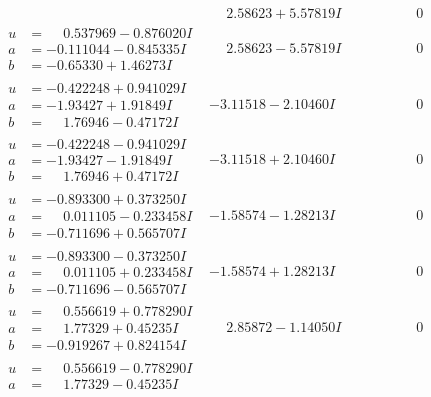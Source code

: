 \documentclass[1p]{elsarticle_modified}
\theoremstyle{definition}
\begin{document}
$$\begin{array}{c|c|c}
 & \phantom{-}2.58623 + 5.57819 I & \phantom{-0.000000 } 0 \\ \hline\begin{aligned}
u &= \phantom{-}0.537969 - 0.876020 I \\
a &= -0.111044 - 0.845335 I \\
b &= -0.65330 + 1.46273 I\end{aligned}
 & \phantom{-}2.58623 - 5.57819 I & \phantom{-0.000000 } 0 \\ \hline\begin{aligned}
u &= -0.422248 + 0.941029 I \\
a &= -1.93427 + 1.91849 I \\
b &= \phantom{-}1.76946 - 0.47172 I\end{aligned}
 & -3.11518 - 2.10460 I & \phantom{-0.000000 } 0 \\ \hline\begin{aligned}
u &= -0.422248 - 0.941029 I \\
a &= -1.93427 - 1.91849 I \\
b &= \phantom{-}1.76946 + 0.47172 I\end{aligned}
 & -3.11518 + 2.10460 I & \phantom{-0.000000 } 0 \\ \hline\begin{aligned}
u &= -0.893300 + 0.373250 I \\
a &= \phantom{-}0.011105 - 0.233458 I \\
b &= -0.711696 + 0.565707 I\end{aligned}
 & -1.58574 - 1.28213 I & \phantom{-0.000000 } 0 \\ \hline\begin{aligned}
u &= -0.893300 - 0.373250 I \\
a &= \phantom{-}0.011105 + 0.233458 I \\
b &= -0.711696 - 0.565707 I\end{aligned}
 & -1.58574 + 1.28213 I & \phantom{-0.000000 } 0 \\ \hline\begin{aligned}
u &= \phantom{-}0.556619 + 0.778290 I \\
a &= \phantom{-}1.77329 + 0.45235 I \\
b &= -0.919267 + 0.824154 I\end{aligned}
 & \phantom{-}2.85872 - 1.14050 I & \phantom{-0.000000 } 0 \\ \hline\begin{aligned}
u &= \phantom{-}0.556619 - 0.778290 I \\
a &= \phantom{-}1.77329 - 0.45235 I \\

\end{aligned}
\end{array}$$
\end{document}
